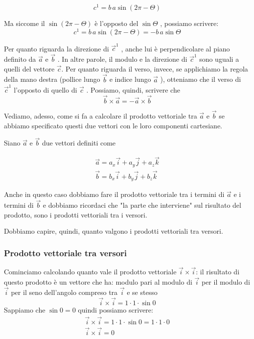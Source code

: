 $$ c^{1} = b\, a \sin(2 \pi - \Theta) $$

Ma siccome il $ \sin(2 \pi - \Theta) $ è l'opposto del $ \sin \Theta $ , possiamo scrivere:
$$ c^{1} = b\, a \sin(2 \pi - \Theta) = -b \, a \sin \Theta $$

Per quanto riguarda la direzione di $ \overrightarrow{c}^{1} $ , anche lui è perpendicolare al piano definito da $ \overrightarrow{a} $ e $ \overrightarrow{b} $ .
In altre parole, il modulo e la direzione di $ \overrightarrow{c}^{1} $ sono uguali a quelli del vettore $ \overrightarrow{c} $. Per quanto riguarda il verso, invece, se applichiamo la regola della mano destra (pollice lungo $\overrightarrow{b} $ e indice lungo $ \overrightarrow{a} $ ), otteniamo che il verso di $\overrightarrow{c}^{1} $ l'opposto di quello di $\overrightarrow{c} $ . Possiamo, quindi, scrivere che
$$ \overrightarrow{b} \times \overrightarrow{a} = - \overrightarrow{a} \times \overrightarrow{b} $$

Vediamo, adesso, come si fa a calcolare il prodotto vettoriale tra $ \overrightarrow{a} $ e $ \overrightarrow{b} $ se abbiamo specificato questi due vettori con le loro componenti cartesiane.

Siano $ \overrightarrow{a} $ e $\overrightarrow{b} $ due vettori definiti come

\begin{align*}
\overrightarrow{a} = a_{x} \overrightarrow{i} + a_{y} \overrightarrow{j} + a_{z}\overrightarrow{k} \\
\overrightarrow{ b} = b_{x} \overrightarrow{i} + b_{y} \overrightarrow{j} + b_{z} \overrightarrow{k} 
\end{align*}

Anche in questo caso dobbiamo fare il prodotto vettoriale tra i termini di $\overrightarrow{a} $ e i termini di $ \overrightarrow{b} $ e dobbiamo ricordaci che "la parte che interviene" sul risultato del prodotto, sono i prodotti vettoriali tra i versori.

Dobbiamo capire, quindi, quanto valgono i prodotti vettoriali tra versori.

\subsubsection{Prodotto vettoriale tra versori}
Cominciamo calcolando quanto vale il prodotto vettoriale $ \overrightarrow{i} \times \overrightarrow{i} $: il risultato di questo prodotto è un vettore che ha:
modulo pari al modulo di $\overrightarrow{i} $ per il modulo di $ \overrightarrow{i} $ per il seno dell'angolo compreso tra $ \overrightarrow{i} $ e se stesso
$$ \overrightarrow{i} \times \overrightarrow{i} = 1 \cdot 1 \cdot \sin 0 $$
Sappiamo che $ \sin 0 = 0 $ quindi possiamo scrivere:
\begin{align*}
	\overrightarrow{i} \times \overrightarrow{i} = 1 \cdot 1 \cdot \sin 0 = 1 \cdot 1 \cdot 0 \\
	\overrightarrow{i} \times \overrightarrow{i} = 0
\end{align*}

